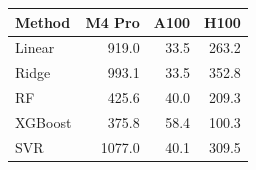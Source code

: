 \begin{tabular}{@{}lrrr@{}}
\toprule
\textbf{Method} & \textbf{M4 Pro} & \textbf{A100} & \textbf{H100} \\
\midrule
Linear & 919.0 & 33.5 & 263.2 \\
Ridge & 993.1 & 33.5 & 352.8 \\
RF & 425.6 & 40.0 & 209.3 \\
XGBoost & 375.8 & 58.4 & 100.3 \\
SVR & 1077.0 & 40.1 & 309.5 \\
\bottomrule
\end{tabular}